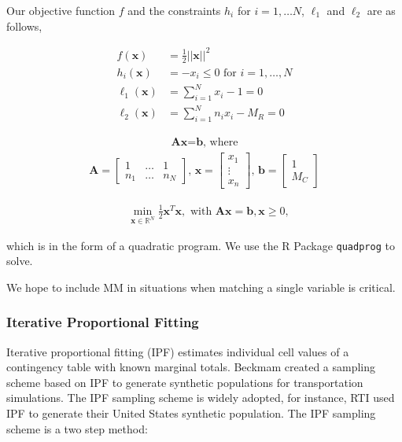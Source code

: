 \documentclass{article}
\begin{document}
		Our objective function $f$ and the constraints $h_i$ for $i=1, \dots N$, $\ell_1$ and $\ell_2$ are as follows,

		\begin{align*}
			f(\textbf{x}) &= \frac{1}{2}||\textbf{x}||^2  \\
			h_i(\textbf{x}) &= - x_i \le 0 \text{ for } i=1, \dots, N \\
			\ell_1(\textbf{x}) &= \sum_{i=1}^N x_i -1 = 0 \\
			\ell_2(\textbf{x}) & = \sum_{i=1}^N n_i x_i - M_R =0 
		\end{align*}

		\begin{align}\label{l3}
		\textbf{Ax} = \textbf{b}\text{, where}
		\end{align}
		\begin{align*}	
		\textbf{A} = \left [ 
		\begin{array}{ccc}
		  1 & \dots & 1 \\
		  n_1 & \dots & n_N 
		\end{array}
		 \right ]\text{, } \textbf{x}=
		\left [
		\begin{array}{c}
		  x_1 \\
		  \vdots \\
		  x_n
		\end{array}
		\right ] \text{, } \textbf{b} =
		\left [
		\begin{array}{c}
		  1 \\
		  M_C
		\end{array}
		\right ] 
		\end{align*}


		\begin{align}
			&\min_{\mathbf{x} \in \mathbb{R}^N} \frac{1}{2} \mathbf{x}^T\mathbf{x}, \text{ with } \mathbf{A}\mathbf{x}=\mathbf{b}, \mathbf{x} \ge 0,
		\end{align}

		which is in the form of a quadratic program. We use the R Package \texttt{quadprog} to solve. 

		We hope to include MM in situations when matching a single variable is critical. 

		\subsubsection{Iterative Proportional Fitting}
		Iterative proportional fitting (IPF) \cite{deming1940least} \cite{fienberg1970iterative} estimates individual cell values of a contingency table with known marginal totals. Beckmam \cite{beckman1996creating} created a sampling scheme based on IPF to generate synthetic populations for transportation simulations. The IPF sampling scheme is widely adopted, for instance, RTI \cite{wheaton2009synthesized} used IPF to generate their United States synthetic population. The IPF sampling scheme is a two step method:
\end{document}
